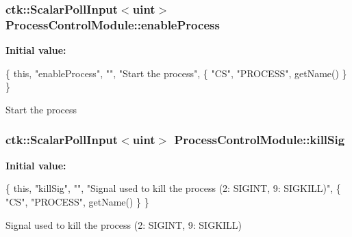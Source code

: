 \subsubsection[{\texorpdfstring{enable\+Process}{enableProcess}}]{\setlength{\rightskip}{0pt plus 5cm}ctk\+::\+Scalar\+Poll\+Input$<$uint$>$ Process\+Control\+Module\+::enable\+Process}\hypertarget{structProcessControlModule_a0e5511753b568a4fde7d00caa1575299}{}\label{structProcessControlModule_a0e5511753b568a4fde7d00caa1575299}
{\bfseries Initial value\+:}
\begin{DoxyCode}
\{ \textcolor{keyword}{this}, \textcolor{stringliteral}{"enableProcess"}, \textcolor{stringliteral}{""}, \textcolor{stringliteral}{"Start the process"},
    \{ \textcolor{stringliteral}{"CS"}, \textcolor{stringliteral}{"PROCESS"}, getName() \} \}
\end{DoxyCode}
Start the process 
\subsubsection[{\texorpdfstring{kill\+Sig}{killSig}}]{\setlength{\rightskip}{0pt plus 5cm}ctk\+::\+Scalar\+Poll\+Input$<$uint$>$ Process\+Control\+Module\+::kill\+Sig}\hypertarget{structProcessControlModule_a47ea8ec5bf7aa3914bb61f12c6aefe59}{}\label{structProcessControlModule_a47ea8ec5bf7aa3914bb61f12c6aefe59}
{\bfseries Initial value\+:}
\begin{DoxyCode}
\{ \textcolor{keyword}{this}, \textcolor{stringliteral}{"killSig"}, \textcolor{stringliteral}{""}, \textcolor{stringliteral}{"Signal used to kill the process (2: SIGINT, 9: SIGKILL)"},
    \{ \textcolor{stringliteral}{"CS"}, \textcolor{stringliteral}{"PROCESS"}, getName() \} \}
\end{DoxyCode}
Signal used to kill the process (2\+: S\+I\+G\+I\+NT, 9\+: S\+I\+G\+K\+I\+LL) 
